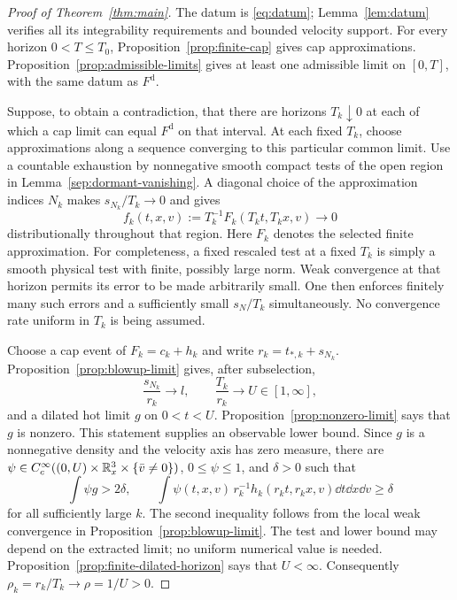 \begin{proof}[Proof of Theorem~\ref{thm:main}]
The datum is \eqref{eq:datum}; Lemma~\ref{lem:datum} verifies all its
integrability requirements and bounded velocity support.
For every horizon \(0<T\le T_0\), Proposition~\ref{prop:finite-cap}
gives cap approximations. Proposition~\ref{prop:admissible-limits}
gives at least one admissible limit on \([0,T]\), with the same datum
as \(F^{\mathrm d}\).

Suppose, to obtain a contradiction, that there are horizons
\(T_k\downarrow0\) at each of which a cap limit can equal
\(F^{\mathrm d}\) on that interval. At each fixed \(T_k\), choose
approximations along a sequence converging to this particular common
limit. Use a countable exhaustion by nonnegative smooth compact tests
of the open region in Lemma~\ref{sep:dormant-vanishing}. A diagonal
choice of the approximation indices \(N_k\) makes \(s_{N_k}/T_k\to0\)
and gives
\begin{equation}\label{sep:diagonal}
f_k(t,x,v):=T_k^{-1}F_k(T_kt,T_kx,v)\longrightarrow0
\end{equation}
distributionally throughout that region.
Here \(F_k\) denotes the selected finite approximation.
For completeness, a fixed rescaled test at a fixed \(T_k\) is simply
a smooth physical test with finite, possibly large norm. Weak
convergence at that horizon permits its error to be made arbitrarily
small. One then enforces finitely many such errors and a sufficiently
small \(s_N/T_k\) simultaneously. No convergence rate uniform in
\(T_k\) is being assumed.

Choose a cap event of \(F_k=c_k+h_k\) and write
\(r_k=t_{*,k}+s_{N_k}\). Proposition~\ref{prop:blowup-limit} gives,
after subselection,
\[
\frac{s_{N_k}}{r_k}\to l,\qquad \frac{T_k}{r_k}\to U\in[1,\infty],
\]
and a dilated hot limit \(g\) on \(0<t<U\).
Proposition~\ref{prop:nonzero-limit} says that \(g\) is nonzero.
This statement supplies an observable lower bound. Since \(g\) is a
nonnegative density and the velocity axis has zero measure, there are
\(\psi\in C_c^\infty((0,U)\times\mathbb R^3_x\times\{\bar v\ne0\})\),
\(0\le\psi\le1\), and \(\delta>0\) such that
\[
 \int\psi g>2\delta,\qquad
 \int\psi(t,x,v)\,r_k^{-1}h_k(r_kt,r_kx,v)\dd t\dd x\dd v
 \ge\delta
\]
for all sufficiently large \(k\). The second inequality follows from
the local weak convergence in Proposition~\ref{prop:blowup-limit}.
The test and lower bound may depend on the extracted limit; no uniform
numerical value is needed.
Proposition~\ref{prop:finite-dilated-horizon} says that \(U<\infty\).
Consequently \(\rho_k=r_k/T_k\to\rho=1/U>0\).


\end{proof}
